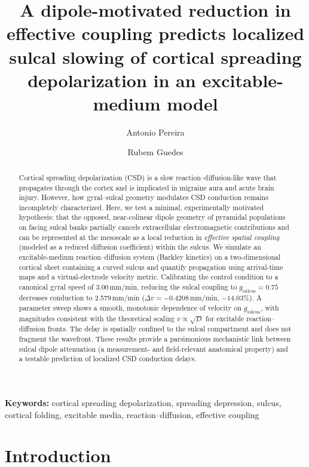 \documentclass[12pt]{article}
\title{A dipole-motivated reduction in effective coupling predicts localized sulcal slowing of cortical spreading depolarization in an excitable-medium model}
\author[1]{Antonio Pereira}
\author[2]{Rubem Guedes}
\affil[1]{Institute of Technology, Federal University of Pará (UFPA)}
\affil[2]{Department of Nutrition, Federal University of Pernambuco (UFPE)}
\date{}
\begin{document}
\maketitle

\begin{abstract}
Cortical spreading depolarization (CSD) is a slow reaction--diffusion-like wave that propagates through the cortex and is implicated in migraine aura and acute brain injury. However, how gyral--sulcal geometry modulates CSD conduction remains incompletely characterized. Here, we test a minimal, experimentally motivated hypothesis: that the opposed, near-colinear dipole geometry of pyramidal populations on facing sulcal banks partially cancels extracellular electromagnetic contributions and can be represented at the mesoscale as a local reduction in \emph{effective spatial coupling} (modeled as a reduced diffusion coefficient) within the sulcus. We simulate an excitable-medium reaction--diffusion system (Barkley kinetics) on a two-dimensional cortical sheet containing a curved sulcus and quantify propagation using arrival-time maps and a virtual-electrode velocity metric.
Calibrating the control condition to a canonical gyral speed of 3.00\,mm/min, reducing the sulcal coupling to $g_{\mathrm{sulcus}}=0.75$ decreases conduction to 2.579\,mm/min ($\Delta v=-0.4208$\,mm/min, $-14.03\%$). A parameter sweep shows a smooth, monotonic dependence of velocity on $g_{\mathrm{sulcus}}$, with magnitudes consistent with the theoretical scaling $v\propto\sqrt{D}$ for excitable reaction--diffusion fronts. The delay is spatially confined to the sulcal compartment and does not fragment the wavefront.
These results provide a parsimonious mechanistic link between sulcal dipole attenuation (a measurement- and field-relevant anatomical property) and a testable prediction of localized CSD conduction delays.
\end{abstract}

\noindent \textbf{Keywords:} cortical spreading depolarization, spreading depression, sulcus, cortical folding, excitable media, reaction--diffusion, effective coupling

\section{Introduction}
\end{document}
